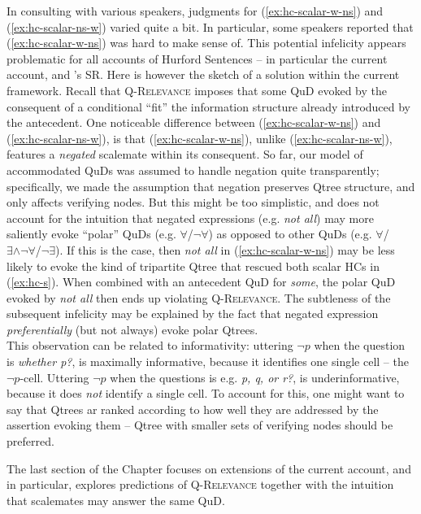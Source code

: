 	In consulting with various speakers, judgments for (\ref{ex:hc-scalar-w-ns}) and (\ref{ex:hc-scalar-ns-w}) varied quite a bit. In particular, some speakers reported that (\ref{ex:hc-scalar-w-ns}) was hard to make sense of. This potential infelicity appears problematic for all accounts of Hurford Sentences -- in particular the current account, and \citet{Kalomoiros2024}'s SR. Here is however the sketch of a solution within the current framework. Recall that \textsc{Q-Relevance} imposes that some QuD evoked by the consequent of a conditional ``fit'' the information structure already introduced by the antecedent. One noticeable difference between (\ref{ex:hc-scalar-w-ns}) and (\ref{ex:hc-scalar-ns-w}), is that (\ref{ex:hc-scalar-w-ns}), unlike (\ref{ex:hc-scalar-ns-w}), features a \textit{negated} scalemate within its consequent. So far, our model of accommodated QuDs was assumed to handle negation quite transparently; specifically, we made the assumption that negation preserves Qtree structure, and only affects verifying nodes. But this might be too simplistic, and does not account for the intuition that negated expressions (e.g. \textit{not all}) may more saliently evoke ``polar'' QuDs (e.g. $\forall$/$\neg\forall$) as opposed to other QuDs (e.g. $\forall$/$\exists\wedge\neg\forall$/$\neg\exists$). If this is the case, then \textit{not all} in (\ref{ex:hc-scalar-w-ns}) may be less likely to evoke the kind of tripartite Qtree that rescued both scalar HCs in (\ref{ex:hc-s}). When combined with an antecedent QuD for \textit{some}, the polar QuD evoked by \textit{not all} then ends up violating \textsc{Q-Relevance}. The subtleness of the subsequent infelicity may be explained by the fact that negated expression \textit{preferentially} (but not always) evoke polar Qtrees.\\
	
	This observation can be related to informativity: uttering $\neg p$ when the question is \textit{whether p?}, is maximally informative, because it identifies one single cell -- the $\neg p$-cell. Uttering $\neg p$ when the questions is e.g. \textit{p, q, or r?}, is underinformative, because it does \textit{not} identify a single cell. To account for this, one might want to say that Qtrees ar ranked according to how well they are addressed by the assertion evoking them -- Qtree with smaller sets of verifying nodes should be preferred.
	
	The last section of the Chapter focuses on extensions of the current account, and in particular, explores predictions of \textsc{Q-Relevance} together with the intuition that scalemates may answer the same QuD.
	
